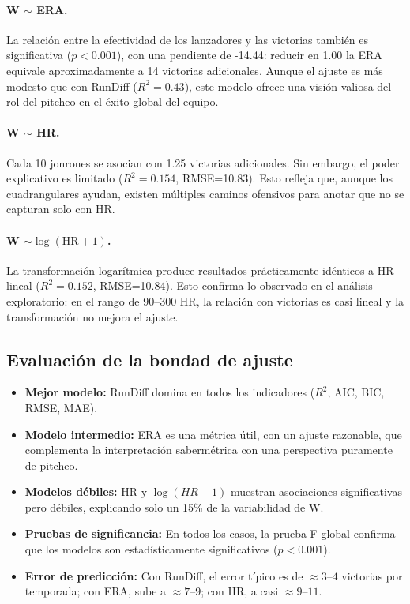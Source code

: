 \documentclass[man,floatsintext]{apa7}
\begin{document}
\paragraph{W \(\sim\) ERA.}  
La relación entre la efectividad de los lanzadores y las victorias también es significativa (\(p<0.001\)), con una pendiente de -14.44: reducir en 1.00 la ERA equivale aproximadamente a 14 victorias adicionales. Aunque el ajuste es más modesto que con RunDiff (\(R^2=0.43\)), este modelo ofrece una visión valiosa del rol del pitcheo en el éxito global del equipo.

\paragraph{W \(\sim\) HR.}  
Cada 10 jonrones se asocian con 1.25 victorias adicionales. Sin embargo, el poder explicativo es limitado (\(R^2=0.154\), RMSE=10.83). Esto refleja que, aunque los cuadrangulares ayudan, existen múltiples caminos ofensivos para anotar que no se capturan solo con HR.

\paragraph{W \(\sim \log(\text{HR}+1)\).}  
La transformación logarítmica produce resultados prácticamente idénticos a HR lineal (\(R^2=0.152\), RMSE=10.84). Esto confirma lo observado en el análisis exploratorio: en el rango de 90–300 HR, la relación con victorias es casi lineal y la transformación no mejora el ajuste.

\subsection{Evaluación de la bondad de ajuste}

\begin{itemize}
    \item \textbf{Mejor modelo:} RunDiff domina en todos los indicadores (\(R^2\), AIC, BIC, RMSE, MAE).
    \item \textbf{Modelo intermedio:} ERA es una métrica útil, con un ajuste razonable, que complementa la interpretación sabermétrica con una perspectiva puramente de pitcheo.
    \item \textbf{Modelos débiles:} HR y \(\log(HR+1)\) muestran asociaciones significativas pero débiles, explicando solo un 15\% de la variabilidad de W.
    \item \textbf{Pruebas de significancia:} En todos los casos, la prueba F global confirma que los modelos son estadísticamente significativos (\(p<0.001\)).
    \item \textbf{Error de predicción:} Con RunDiff, el error típico es de $\approx 3\text{--}4$ victorias por temporada; con ERA, sube a $\approx 7\text{--}9$; con HR, a casi $\approx 9\text{--}11$.
\end{itemize}
\end{document}
